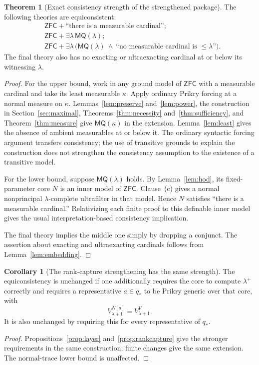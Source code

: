 \documentclass[11pt,letterpaper]{article}
\theoremstyle{definition}
\newtheorem{theorem}[definition]{Theorem}
\newtheorem{corollary}[definition]{Corollary}
\numberwithin{equation}{section}
\newcommand{\ZFC}{\mathsf{ZFC}}
\newcommand{\MQ}{\mathsf{MQ}}
\begin{document}
\begin{theorem}[Exact consistency strength of the strengthened package]\label{thm:equiconsistency}
The following theories are equiconsistent:
\begin{align*}
 &\ZFC+\text{``there is a measurable cardinal''};\\
 &\ZFC+\exists\lambda\,\MQ(\lambda);\\
 &\ZFC+\exists\lambda\,
   \bigl(\MQ(\lambda)\ \wedge\ \text{``no measurable cardinal is }\leq\lambda\text{''}\bigr).
\end{align*}
The final theory also has no exacting or ultraexacting cardinal at or below its witnessing $\lambda$.
\end{theorem}
\begin{proof}
For the upper bound, work in any ground model of $\ZFC$ with a measurable cardinal and take its least measurable $\kappa$. Apply ordinary Prikry forcing at a normal measure on $\kappa$. Lemmas~\ref{lem:preserve} and~\ref{lem:power}, the construction in Section~\ref{sec:maximal}, Theorems~\ref{thm:necessity} and~\ref{thm:sufficiency}, and Theorem~\ref{thm:measure} give $\MQ(\kappa)$ in the extension. Lemma~\ref{lem:least} gives the absence of ambient measurables at or below it. The ordinary syntactic forcing argument transfers consistency; the use of transitive grounds to explain the construction does not strengthen the consistency assumption to the existence of a transitive model.

For the lower bound, suppose $\MQ(\lambda)$ holds. By Lemma~\ref{lem:hod}, its fixed-parameter core $N$ is an inner model of $\ZFC$. Clause~(c) gives a normal nonprincipal $\lambda$-complete ultrafilter in that model. Hence $N$ satisfies ``there is a measurable cardinal.'' Relativizing each finite proof to this definable inner model gives the usual interpretation-based consistency implication.

The final theory implies the middle one simply by dropping a conjunct. The assertion about exacting and ultraexacting cardinals follows from Lemma~\ref{lem:embedding}.
\end{proof}

\begin{corollary}[The rank-capture strengthening has the same strength]\label{cor:rankstrength}
The equiconsistency is unchanged if one additionally requires the core to compute $\lambda^+$ correctly and requires a representative $a\in q_*$ to be Prikry generic over that core, with
\[
 V_{\lambda+1}^{N[a]}=V_{\lambda+1}^V.
\]
It is also unchanged by requiring this for every representative of $q_*$.
\end{corollary}
\begin{proof}
Propositions~\ref{prop:layer} and~\ref{prop:rankcapture} give the stronger requirements in the same construction; finite changes give the same extension. The normal-trace lower bound is unaffected.
\end{proof}
\end{document}
